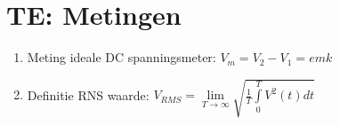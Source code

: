 \documentclass[12pt]{article}
\begin{document}
    \maketitle

	\section{TE: Metingen}%
	\label{sec:TE:_Metingen}
	
	\begin{enumerate}
		\item Meting ideale DC spanningsmeter: $ V_m = V_2 - V_1 = emk $
		\item Definitie RNS waarde: $ V_{RMS} = \lim\limits_{T\to\infty} \sqrt{ \frac{1}{T} \int\limits_0^T V^2(t)dt }$
	\end{enumerate}
	
\end{document}
